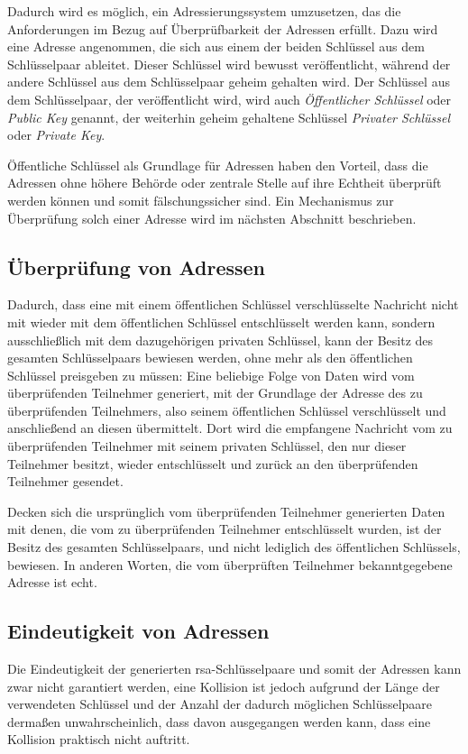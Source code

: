 Dadurch wird es möglich, ein Adressierungssystem umzusetzen, das die Anforderungen im Bezug auf
Überprüfbarkeit der Adressen erfüllt. Dazu wird eine Adresse angenommen, die sich aus einem der
beiden Schlüssel aus dem Schlüsselpaar ableitet. Dieser Schlüssel wird bewusst veröffentlicht,
während der andere Schlüssel aus dem Schlüsselpaar geheim gehalten wird.
Der Schlüssel aus dem Schlüsselpaar, der veröffentlicht wird, wird auch \emph{Öffentlicher Schlüssel}
oder \emph{Public Key} genannt, der weiterhin geheim gehaltene Schlüssel \emph{Privater Schlüssel} oder
\emph{Private Key}.

Öffentliche Schlüssel als Grundlage für Adressen haben den Vorteil, dass die Adressen ohne höhere
Behörde oder zentrale Stelle auf ihre Echtheit überprüft werden können und somit fälschungssicher sind.
Ein Mechanismus zur Überprüfung solch einer Adresse wird im nächsten Abschnitt beschrieben.

\subsection{Überprüfung von Adressen}
\label{dcl-addr-proving}
Dadurch, dass eine mit einem öffentlichen Schlüssel verschlüsselte Nachricht nicht mit wieder mit dem
öffentlichen Schlüssel entschlüsselt werden kann, sondern ausschließlich mit dem dazugehörigen privaten
Schlüssel, kann der Besitz des gesamten Schlüsselpaars bewiesen werden, ohne mehr als den öffentlichen
Schlüssel preisgeben zu müssen: Eine beliebige Folge von Daten wird vom überprüfenden Teilnehmer
generiert, mit der Grundlage der Adresse des zu überprüfenden Teilnehmers, also seinem öffentlichen
Schlüssel verschlüsselt und anschließend an diesen übermittelt. Dort wird die empfangene Nachricht vom zu
überprüfenden Teilnehmer mit seinem privaten Schlüssel, den nur dieser Teilnehmer besitzt, wieder
entschlüsselt und zurück an den überprüfenden Teilnehmer gesendet.

Decken sich die ursprünglich vom überprüfenden Teilnehmer generierten Daten mit denen, die vom zu
überprüfenden Teilnehmer entschlüsselt wurden, ist der Besitz des gesamten Schlüsselpaars, und nicht
lediglich des öffentlichen Schlüssels, bewiesen. In anderen Worten, die vom überprüften Teilnehmer
bekanntgegebene Adresse ist echt.



\subsection{Eindeutigkeit von Adressen}
\label{dcl-addr-uniqueness}
Die Eindeutigkeit der generierten \gls{rsa}-Schlüsselpaare und somit der Adressen kann zwar nicht
garantiert werden, eine Kollision ist jedoch aufgrund der Länge der verwendeten Schlüssel und der
Anzahl der dadurch möglichen Schlüsselpaare dermaßen unwahrscheinlich, dass davon ausgegangen
werden kann, dass eine Kollision praktisch nicht auftritt. \cite{crypto.stackexchange.com/a/2559:rsa-key-collision}

